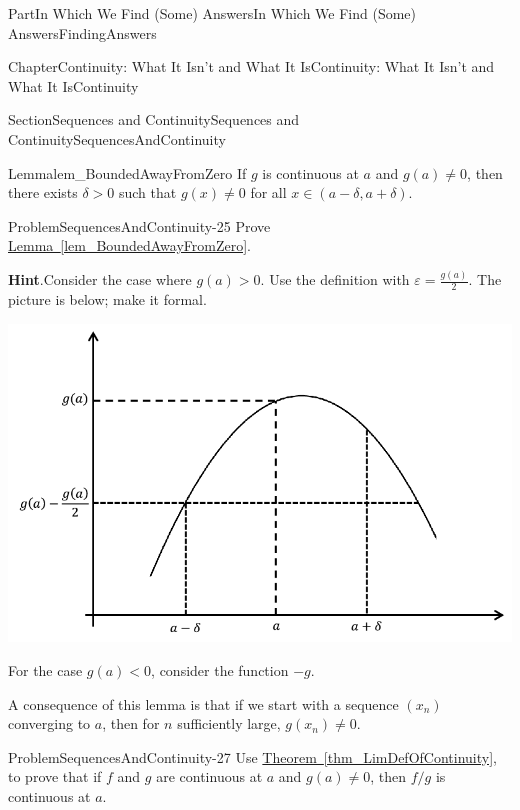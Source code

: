 \documentclass[oneside,10pt,]{book}
\newcommand{\blocktitlefont}{\relax}
\newcommand{\xreffont}{\relax}
\numberwithin{equation}{part}
\newcommand{\eps}{\varepsilon}
\newcommand{\lt}{<}
\begin{document}
\begin{partptx}{Part}{In Which We Find (Some) Answers}{}{In Which We Find (Some) Answers}{}{}{FindingAnswers}
\begin{chapterptx}{Chapter}{Continuity: What It Isn't and What It Is}{}{Continuity: What It Isn't and What It Is}{}{}{Continuity}
\begin{sectionptx}{Section}{Sequences and Continuity}{}{Sequences and Continuity}{}{}{SequencesAndContinuity}
\begin{lemma}{Lemma}{}{}{lem_BoundedAwayFromZero}
If \(g\) is continuous at \(a\) and \(g(a)\neq 0\), then there exists \(\delta>0\) such that \(g(x)\neq
0\) for all \(x\in(a-\delta,a+\delta)\).%
\end{lemma}
\begin{problem}{Problem}{}{SequencesAndContinuity-25}%
Prove \hyperref[lem_BoundedAwayFromZero]{Lemma~{\xreffont\ref{lem_BoundedAwayFromZero}}}.%
\par\smallskip%
\noindent\textbf{\blocktitlefont Hint}.\hypertarget{SequencesAndContinuity-25-4}{}\quad{}Consider the case where \(g(a)>0\).  Use the definition with \(\eps=\frac{g(a)}{2}\).  The picture is below; make it formal.%
\begin{image}{0.125}{0.75}{0.125}{}%
\includegraphics[width=\linewidth]{external/images/Ch5fig8.png}
\end{image}%
For the case \(g(a)\lt 0\), consider the function \(-g\).%
\end{problem}
A consequence of this lemma is that if we start with a sequence \(\left(x_n\right)\) converging to \(a\), then for \(n\) sufficiently large, \(g(x_n)\neq 0\).%
\begin{problem}{Problem}{}{SequencesAndContinuity-27}%
Use \hyperref[thm_LimDefOfContinuity]{Theorem~{\xreffont\ref{thm_LimDefOfContinuity}}}, to prove that if \(f\) and \(g\) are continuous at \(a\) and \(g(a)\neq 0\), then \(f/g\) is continuous at \(a\).%
\end{problem}
\end{sectionptx}
\end{chapterptx}
\end{partptx}
\end{document}
